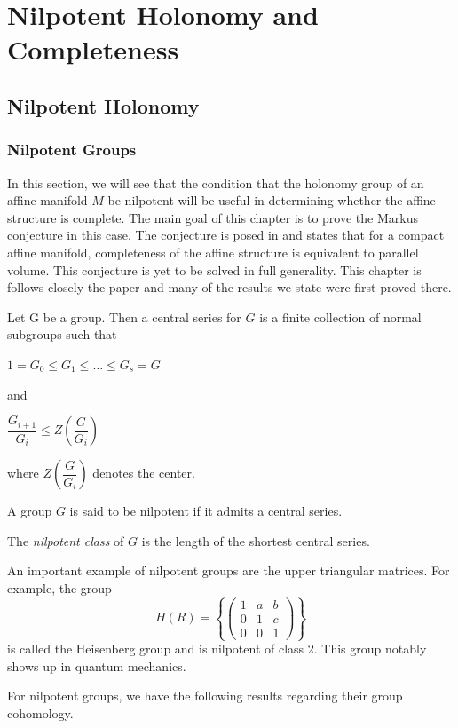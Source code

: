 \chapter{Nilpotent Holonomy and Completeness}\label{ch:nilpotent-hol}
\section{Nilpotent Holonomy}
\subsection{Nilpotent Groups}

In this section, we will see that the condition that the holonomy group of an
affine manifold $M$ be nilpotent will be useful in determining whether the
affine structure is complete. The main goal of this chapter is to prove the
Markus conjecture in this case. The conjecture is posed in
\cite{markus1963cosmological} and states that for a compact affine manifold,
completeness of the affine structure is equivalent to parallel volume. This
conjecture is yet to be solved in full generality. This chapter is follows
closely the paper \cite{nilpotent-holonomy} and many of the results we state
were first proved there.

\begin{definition}
    Let G be a group. Then a central series for $G$ is a finite collection of normal subgroups
    such that
    \begin{center}
        $1=G_0 \leq G_1 \leq \dots \leq G_s = G$
    \end{center}
    and
    \begin{center}
        $\dfrac{G_{i+1}}{G_i} \leq Z(\dfrac{G}{G_i})$
    \end{center}
    where $Z(\dfrac{G}{G_i})$ denotes the center.
\end{definition}

\begin{definition}
    A group $G$ is said to be nilpotent if it admits a central series.
\end{definition}
\begin{remark}
    The \textit{nilpotent class} of $G$ is the length of the shortest central series.
\end{remark}

\begin{eg}
    An important example of nilpotent groups are the upper triangular matrices. For example, the group
    $$
        H(R) = \left\{\begin{pmatrix}
            1 & a & b \\
            0 & 1 & c \\
            0 & 0 & 1
        \end{pmatrix}\right\}
    $$
    is called the Heisenberg group and is nilpotent of class 2. This group notably shows up in quantum mechanics.
\end{eg}
For nilpotent groups, we have the following results regarding their group
cohomology.

